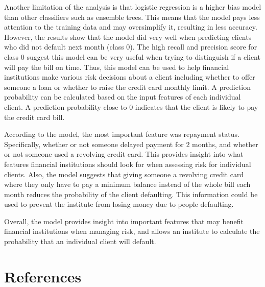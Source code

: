 \documentclass[
]{article}
\begin{document}
Another limitation of the analysis is that logistic regression is a
higher bias model than other classifiers such as ensemble trees. This
means that the model pays less attention to the training data and may
oversimplify it, resulting in less accuracy. However, the results show
that the model did very well when predicting clients who did not default
next month (class 0). The high recall and precision score for class 0
suggest this model can be very useful when trying to distinguish if a
client will pay the bill on time. Thus, this model can be used to help
financial institutions make various risk decisions about a client
including whether to offer someone a loan or whether to raise the credit
card monthly limit. A prediction probability can be calculated based on
the input features of each individual client. A prediction probability
close to 0 indicates that the client is likely to pay the credit card
bill.

According to the model, the most important feature was repayment status.
Specifically, whether or not someone delayed payment for 2 months, and
whether or not someone used a revolving credit card. This provides
insight into what features financial institutions should look for when
assessing risk for individual clients. Also, the model suggests that
giving someone a revolving credit card where they only have to pay a
minimum balance instead of the whole bill each month reduces the
probability of the client defaulting. This information could be used to
prevent the institute from losing money due to people defaulting.

Overall, the model provides insight into important features that may
benefit financial institutions when managing risk, and allows an
institute to calculate the probability that an individual client will
default.

\hypertarget{references}{%
\section*{References}\label{references}}
\end{document}
